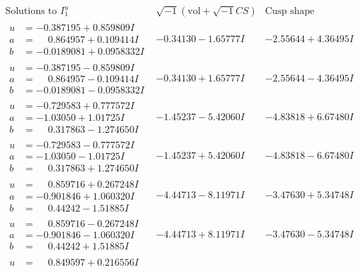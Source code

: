 \documentclass[1p]{elsarticle_modified}
\theoremstyle{definition}
\newcommand{\I}{\sqrt{-1}}
\begin{document}
$$\begin{array}{c|c|c}  
\text{Solutions to }I^u_{1}& \I (\text{vol} + \sqrt{-1}CS) & \text{Cusp shape}\\
 \hline 
\begin{aligned}
u &= -0.387195 + 0.859809 I \\
a &= \phantom{-}0.864957 + 0.109414 I \\
b &= -0.0189081 + 0.0958332 I\end{aligned}
 & -0.34130 - 1.65777 I & -2.55644 + 4.36495 I \\ \hline\begin{aligned}
u &= -0.387195 - 0.859809 I \\
a &= \phantom{-}0.864957 - 0.109414 I \\
b &= -0.0189081 - 0.0958332 I\end{aligned}
 & -0.34130 + 1.65777 I & -2.55644 - 4.36495 I \\ \hline\begin{aligned}
u &= -0.729583 + 0.777572 I \\
a &= -1.03050 + 1.01725 I \\
b &= \phantom{-}0.317863 - 1.274650 I\end{aligned}
 & -1.45237 - 5.42060 I & -4.83818 + 6.67480 I \\ \hline\begin{aligned}
u &= -0.729583 - 0.777572 I \\
a &= -1.03050 - 1.01725 I \\
b &= \phantom{-}0.317863 + 1.274650 I\end{aligned}
 & -1.45237 + 5.42060 I & -4.83818 - 6.67480 I \\ \hline\begin{aligned}
u &= \phantom{-}0.859716 + 0.267248 I \\
a &= -0.901846 + 1.060320 I \\
b &= \phantom{-}0.44242 - 1.51885 I\end{aligned}
 & -4.44713 - 8.11971 I & -3.47630 + 5.34748 I \\ \hline\begin{aligned}
u &= \phantom{-}0.859716 - 0.267248 I \\
a &= -0.901846 - 1.060320 I \\
b &= \phantom{-}0.44242 + 1.51885 I\end{aligned}
 & -4.44713 + 8.11971 I & -3.47630 - 5.34748 I \\ \hline\begin{aligned}
u &= \phantom{-}0.849597 + 0.216556 I \\

\end{aligned}
\end{array}$$
\end{document}
